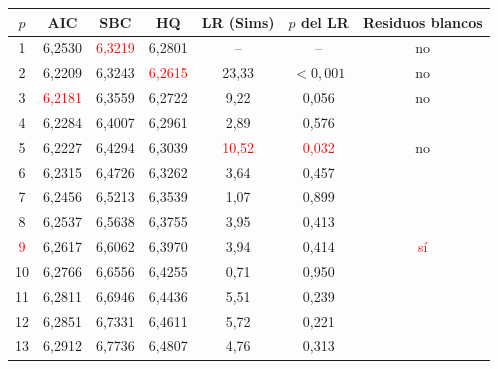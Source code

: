 \begin{tabular}{ccccccc}
\toprule
$p$ & AIC & SBC & HQ & LR (Sims) & $p$ del LR & Residuos blancos
\\ \midrule
1 & 6{,}2530 & \textcolor{red}{6{,}3219} & 6{,}2801 & -- & -- & no \\
2 & 6{,}2209 & 6{,}3243 & \textcolor{red}{6{,}2615} & 23{,}33 & \ensuremath{<0{,}001} & no \\
3 & \textcolor{red}{6{,}2181} & 6{,}3559 & 6{,}2722 & 9{,}22 & 0{,}056 & no \\
4 & 6{,}2284 & 6{,}4007 & 6{,}2961 & 2{,}89 & 0{,}576 &  \\
5 & 6{,}2227 & 6{,}4294 & 6{,}3039 & \textcolor{red}{10{,}52} & \textcolor{red}{0{,}032} & no \\
6 & 6{,}2315 & 6{,}4726 & 6{,}3262 & 3{,}64 & 0{,}457 &  \\
7 & 6{,}2456 & 6{,}5213 & 6{,}3539 & 1{,}07 & 0{,}899 &  \\
8 & 6{,}2537 & 6{,}5638 & 6{,}3755 & 3{,}95 & 0{,}413 &  \\
\textcolor{red}{9} & 6{,}2617 & 6{,}6062 & 6{,}3970 & 3{,}94 & 0{,}414 & \textcolor{red}{s\'i} \\
10 & 6{,}2766 & 6{,}6556 & 6{,}4255 & 0{,}71 & 0{,}950 &  \\
11 & 6{,}2811 & 6{,}6946 & 6{,}4436 & 5{,}51 & 0{,}239 &  \\
12 & 6{,}2851 & 6{,}7331 & 6{,}4611 & 5{,}72 & 0{,}221 &  \\
13 & 6{,}2912 & 6{,}7736 & 6{,}4807 & 4{,}76 & 0{,}313 &  \\
\bottomrule
\end{tabular}
